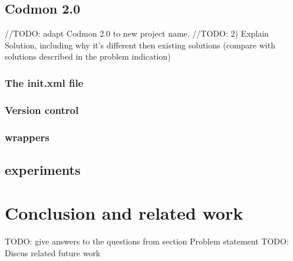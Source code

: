 \documentclass[a4paper,10pt]{scrartcl}
\begin{document}
\subsection{Codmon 2.0}
//TODO: adapt Codmon 2.0 to new project name.
//TODO: 2) Explain Solution, including why it's different then existing solutions (compare with solutions described in the problem indication)

\subsubsection{The init.xml file}
\label{subsec:init}

\subsubsection{Version control}
\label{subsec:versionControl}

\subsubsection{wrappers}
\label{subsec:wrappers}

\subsection{experiments}
\label{sec:experiments}

\newpage

\section{Conclusion and related work}
\label{sec:conclusion}
TODO: give answers to the questions from section Problem statement
TODO: Discus related future work
\newpage


\end{document}
